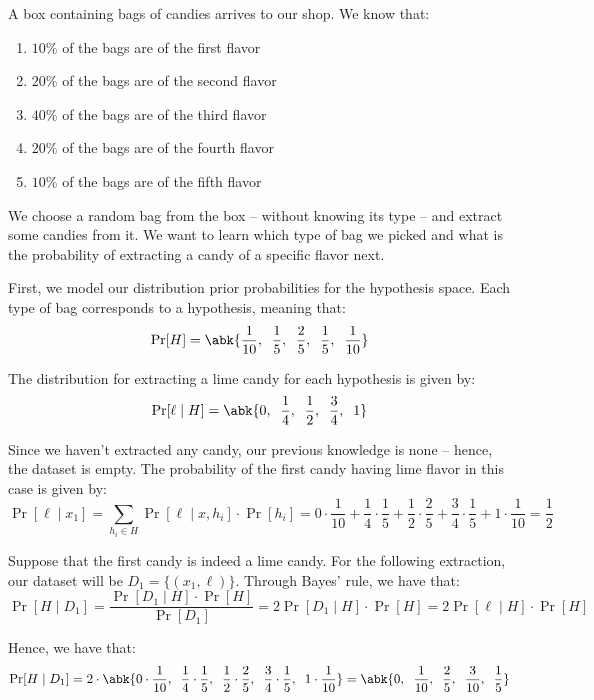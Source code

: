 \documentclass[a4paper, 12pt]{report}
\begin{document}
    A box containing bags of candies arrives to our shop. We know that:
    \begin{enumerate}
        \item $10\%$ of the bags are of the first flavor
        \item $20\%$ of the bags are of the second flavor
        \item $40\%$ of the bags are of the third flavor
        \item $20\%$ of the bags are of the fourth flavor
        \item $10\%$ of the bags are of the fifth flavor
    \end{enumerate}

    We choose a random bag from the box -- without knowing its type -- and extract some candies from it. We want to learn which type of bag we picked and what is the probability of extracting a candy of a specific flavor next.

    First, we model our distribution prior probabilities for the hypothesis space. Each type of bag corresponds to a hypothesis, meaning that:
    \[\Pr[H] = \abk{\frac{1}{10}, \;\; \frac{1}{5}, \;\; \frac{2}{5}, \;\; \frac{1}{5}, \;\; \frac{1}{10}}\]

    The distribution for extracting a lime candy for each hypothesis is given by:
    \[\Pr[\ell \mid H] = \abk{0, \;\; \frac{1}{4}, \;\; \frac{1}{2}, \;\; \frac{3}{4}, \;\; 1}\]
    
    Since we haven't extracted any candy, our previous knowledge is none -- hence, the dataset is empty. The probability of the first candy having lime flavor in this case is given by:
    \[\Pr[\ell \mid x_1] = \sum_{h_i \in H} \Pr[\ell \mid x, h_i] \cdot \Pr[h_i] = 0 \cdot \frac{1}{10} + \frac{1}{4} \cdot \frac{1}{5} + \frac{1}{2} \cdot \frac{2}{5} + \frac{3}{4} \cdot \frac{1}{5} + 1 \cdot \frac{1}{10} = \frac{1}{2}\]

    Suppose that the first candy is indeed a lime candy. For the following extraction, our dataset will be $D_1 = \{(x_1, \ell)\}$. Through Bayes' rule, we have that:
    \[\Pr[H \mid D_1] = \frac{\Pr[D_1 \mid H] \cdot \Pr[H]}{\Pr[D_1]} = 2 \Pr[D_1 \mid H] \cdot \Pr[H] = 2 \Pr[\ell \mid H] \cdot \Pr[H]\]

    Hence, we have that:
    \[\Pr[H \mid D_1] =  2 \cdot \abk{0 \cdot \frac{1}{10}, \;\; \frac{1}{4} \cdot \frac{1}{5}, \;\; \frac{1}{2} \cdot \frac{2}{5}, \;\; \frac{3}{4} \cdot \frac{1}{5}, \;\; 1 \cdot \frac{1}{10}} = \abk{0, \;\; \frac{1}{10}, \;\; \frac{2}{5}, \;\; \frac{3}{10}, \;\; \frac{1}{5}} \]
\end{document}
